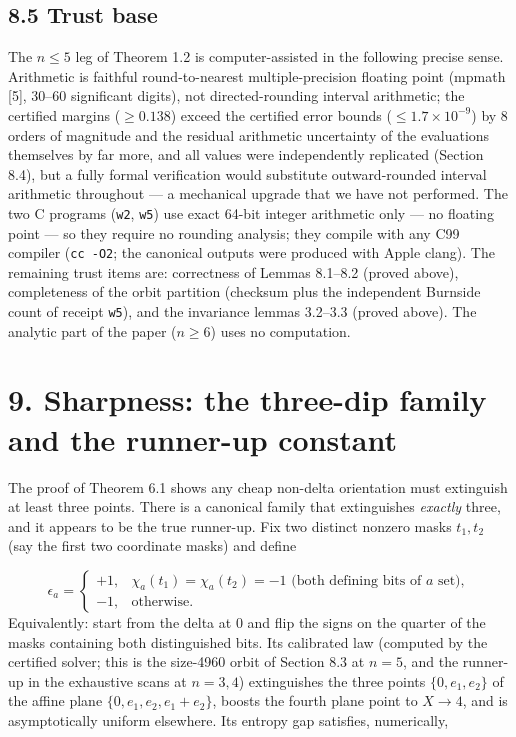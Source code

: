 \documentclass[11pt]{article}
\begin{document}
\subsection*{8.5 Trust base}
The $n \le 5$ leg of Theorem 1.2 is computer-assisted in the following precise sense.  Arithmetic is faithful round-to-nearest multiple-precision floating point (mpmath [5], 30–60 significant digits), not directed-rounding interval arithmetic; the certified margins ($\ge 0.138$) exceed the certified error bounds ($\le 1.7\times10^{-9}$) by 8 orders of magnitude and the residual arithmetic uncertainty of the evaluations themselves by far more, and all values were independently replicated (Section 8.4), but a fully formal verification would substitute outward-rounded interval arithmetic throughout — a mechanical upgrade that we have not performed.  The two C programs (\texttt{w2}, \texttt{w5}) use exact 64-bit integer arithmetic only — no floating point — so they require no rounding analysis; they compile with any C99 compiler (\texttt{cc -O2}; the canonical outputs were produced with Apple clang).  The remaining trust items are: correctness of Lemmas 8.1–8.2 (proved above), completeness of the orbit partition (checksum plus the independent Burnside count of receipt \texttt{w5}), and the invariance lemmas 3.2–3.3 (proved above).  The analytic part of the paper ($n \ge 6$) uses no computation.

\section*{9. Sharpness: the three-dip family and the runner-up constant}
The proof of Theorem 6.1 shows any cheap non-delta orientation must extinguish at least three points.  There is a canonical family that extinguishes \emph{exactly} three, and it appears to be the true runner-up. Fix two distinct nonzero masks $t_1, t_2$ (say the first two coordinate masks) and define

\[
\epsilon_a = \begin{cases}
+1, & \chi_a(t_1) = \chi_a(t_2) = -1
\text{ (both defining bits of } a \text{ set)},\\
-1, & \text{otherwise.}
\end{cases}
\]
Equivalently: start from the delta at $0$ and flip the signs on the quarter of the masks containing both distinguished bits.  Its calibrated law (computed by the certified solver; this is the size-4960 orbit of Section 8.3 at $n=5$, and the runner-up in the exhaustive scans at $n = 3, 4$) extinguishes the three points $\{0, e_1, e_2\}$ of the affine plane $\{0, e_1, e_2, e_1{+}e_2\}$, boosts the fourth plane point to $X \to 4$, and is asymptotically uniform elsewhere.  Its entropy gap satisfies, numerically,
\end{document}
